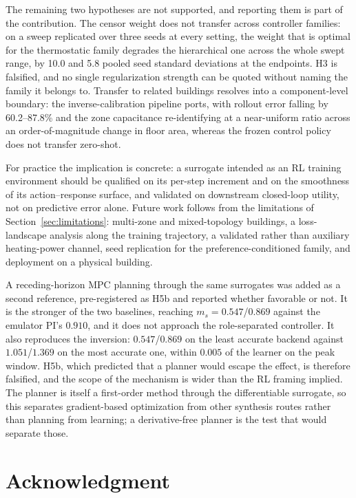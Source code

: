 \documentclass{ieeeaccess}
\newcommand{\ms}{\ensuremath{m_s}}
\begin{document}
The remaining two hypotheses are not supported, and reporting them is part of
the contribution. The censor weight does not transfer across controller
families: on a sweep replicated over three seeds at every setting, the weight
that is optimal for the thermostatic family degrades the hierarchical one across
the whole swept range, by 10.0 and 5.8 pooled seed standard deviations at the
endpoints. H3 is falsified, and no single regularization strength can be quoted
without naming the family it belongs to. Transfer to related buildings resolves
into a component-level boundary: the inverse-calibration pipeline ports, with
rollout error falling by 60.2--87.8\% and the zone capacitance re-identifying at
a near-uniform ratio across an order-of-magnitude change in floor area, whereas
the frozen control policy does not transfer zero-shot.

For practice the implication is concrete: a surrogate intended as an RL training
environment should be qualified on its per-step increment and on the smoothness
of its action--response surface, and validated on downstream closed-loop
utility, not on predictive error alone. Future work follows from the limitations
of Section~\ref{sec:limitations}: multi-zone and mixed-topology buildings, a
loss-landscape analysis along the training trajectory, a validated rather than
auxiliary heating-power channel, seed replication for the
preference-conditioned family, and deployment on a physical building.

A receding-horizon MPC planning through the same surrogates was added as a
second reference, pre-registered as H5b and reported whether favorable or not.
It is the stronger of the two baselines, reaching $\ms=0.547$/$0.869$ against the
emulator PI's $0.910$, and it does not approach the role-separated controller.
It also reproduces the inversion: $0.547$/$0.869$ on the least accurate backend
against $1.051$/$1.369$ on the most accurate one, within $0.005$ of the learner
on the peak window. H5b, which predicted that a planner would escape the effect,
is therefore falsified, and the scope of the mechanism is wider than the RL
framing implied. The planner is itself a first-order method through the
differentiable surrogate, so this separates gradient-based optimization from
other synthesis routes rather than planning from learning; a derivative-free
planner is the test that would separate those.

\section*{Acknowledgment}
\end{document}
